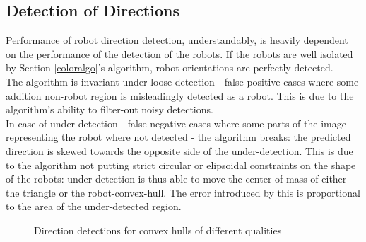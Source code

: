 \documentclass[10pt,a4paper]{article}
\begin{document}
\subsection{Detection of Directions}\label{directionresults}
Performance of robot direction detection, understandably, is heavily dependent 
on the performance of the detection of the robots. If the robots are well
isolated by Section \ref{coloralgo}'s algorithm, robot orientations are 
perfectly detected.\\
The algorithm is invariant under loose detection - false positive cases where 
some addition non-robot region is misleadingly detected as a robot. This is 
due to the algorithm's ability to filter-out noisy detections.\\
In case of under-detection - false negative cases where some parts of the image
representing the robot where not detected - the algorithm breaks: the predicted
direction is skewed towards the opposite side of the under-detection. This is
due to the algorithm not putting strict circular or elipsoidal constraints on 
the shape of the robots: under detection is thus able to move the center of 
mass of either the triangle or the robot-convex-hull. The error introduced by 
this is proportional to the area of the under-detected region.
\begin{figure}[ht]
    \begin{center}
    \end{center}
    \caption{Direction detections for convex hulls of different qualities}
\end{figure} 
\end{document}

